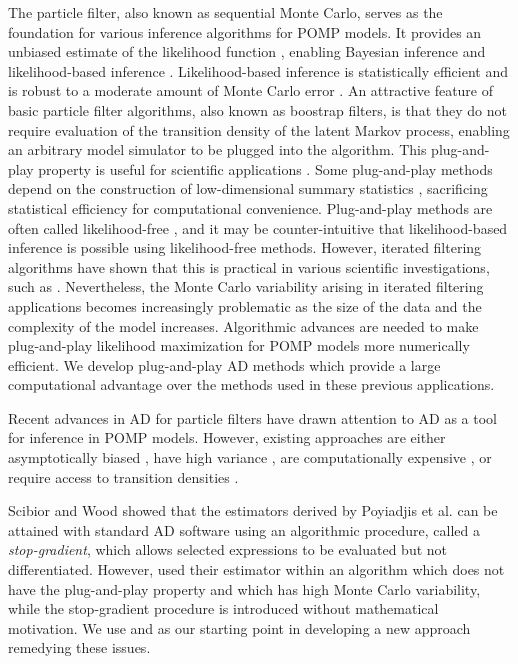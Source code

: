 \documentclass[9pt,twocolumn,pnasresearcharticle]{pnas-new}
\begin{document}
The particle filter, also known as sequential Monte Carlo, serves as the foundation for various inference algorithms for POMP models.
It provides an unbiased estimate of the likelihood function  \cite{delMoral04}, enabling Bayesian inference \cite{andrieu10,chopin13} and likelihood-based inference \cite{ionides06-pnas,ionides15}.
Likelihood-based inference is statistically efficient \cite{pawitan01} and is robust to a moderate amount of Monte Carlo error \cite{ionides17,ning21}.
An attractive feature of basic particle filter algorithms, also known as boostrap filters, is that they do not require evaluation of the transition density of the latent Markov process, enabling an arbitrary model simulator to be plugged into the algorithm.
This plug-and-play property is useful for scientific applications \cite{he10}.
Some plug-and-play methods depend on the construction of low-dimensional summary statistics \cite{wood10,toni09}, sacrificing statistical efficiency for computational convenience.
Plug-and-play methods are often called likelihood-free \cite{owen15}, and it may be counter-intuitive that likelihood-based inference is possible using likelihood-free methods. 
However, iterated filtering algorithms have shown that this is practical in various scientific investigations, such as \cite{king08,blake14,pons-salort18,subramanian21,fox22,drake23}.
Nevertheless, the Monte Carlo variability arising in iterated filtering applications becomes increasingly problematic as the size of the data and the complexity of the model increases.
Algorithmic advances are needed to make plug-and-play likelihood maximization for POMP models more numerically efficient.
We develop plug-and-play AD methods which provide a large computational advantage over the methods used in these previous applications.


Recent advances in AD for particle filters \cite{naesseth18, jonschkowski18, corenflos21, scibior21, singh22} have drawn attention to AD as a tool for inference in POMP models.
However, existing approaches are either asymptotically biased \cite{naesseth18, jonschkowski18}, have high variance \cite{poyiadjis11, scibior21}, are computationally expensive \cite{corenflos21, chen24}, or require access to transition densities \cite{poyiadjis11, scibior21, singh22, chen24}.

Scibior and Wood \cite{scibior21} showed that the estimators derived by Poyiadjis et al. \cite{poyiadjis11} can be attained with standard AD software using an algorithmic procedure, called a {\it stop-gradient}, which allows selected expressions to be evaluated but not differentiated.
However, \cite{scibior21} used their estimator within an algorithm which does not have the plug-and-play property and which has high Monte Carlo variability, while the stop-gradient procedure is introduced without mathematical motivation.
We use \cite{scibior21} and \cite{poyiadjis11} as our starting point in developing a new approach remedying these issues.
\end{document}
